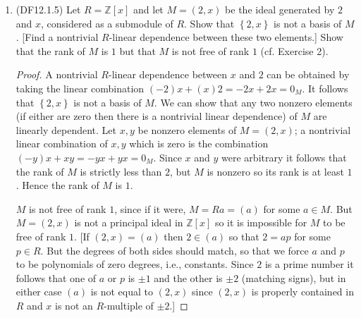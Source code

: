 \documentclass[11pt]{article}
\newcommand{\cbr}[1]{\left\{#1\right\}}
\begin{document}
\begin{enumerate}
\begin{enumerate}[label=\textbf{(\alph*)}]
\begin{proof}
            Hence the rank of $M$ is $n$.
        \end{proof}
    \end{enumerate}
    \item (DF12.1.5) Let $R = \mathbb{Z}[x]$ and let $M = (2,x)$ be the ideal generated by $2$ and $x$, considered as a submodule of $R$. Show that $\cbr{2,x}$ is not a basis of $M$. [Find a nontrivial $R$-linear dependence between these two elements.] Show that the rank of $M$ is $1$ but that $M$ is not free of rank $1$ (cf. Exercise 2).\begin{proof}
        A nontrivial $R$-linear dependence between $x$ and $2$ can be obtained by taking the linear combination $(-2)x + (x)2 = -2x + 2x = 0_M$. It follows that $\cbr{2,x}$ is not a basis of $M$. We can show that any two nonzero elements (if either are zero then there is a nontrivial linear dependence) of $M$ are linearly dependent. Let $x,y$ be nonzero elements of $M = (2,x)$; a nontrivial linear combination of $x,y$ which is zero is the combination $(-y)x + xy = -yx + yx = 0_M$. Since $x$ and $y$ were arbitrary it follows that the rank of $M$ is strictly less than $2$, but $M$ is nonzero so its rank is at least $1$. Hence the rank of $M$ is $1$.

        $M$ is not free of rank $1$, since if it were, $M = Ra = (a)$ for some $a\in M$. But $M = (2,x)$ is not a principal ideal in $\mathbb{Z}[x]$ so it is impossible for $M$ to be free of rank $1$. [If $(2,x) = (a)$ then $2\in (a)$ so that $2 = ap$ for some $p\in R$. But the degrees of both sides should match, so that we force $a$ and $p$ to be polynomials of zero degrees, i.e., constants. Since $2$ is a prime number it follows that one of $a$ or $p$ is $\pm 1$ and the other is $\pm 2$ (matching signs), but in either case $(a)$ is not equal to $(2,x)$ since $(2,x)$ is properly contained in $R$ and $x$ is not an $R$-multiple of $\pm 2$.]
    \end{proof}
\end{enumerate}
\end{document}
